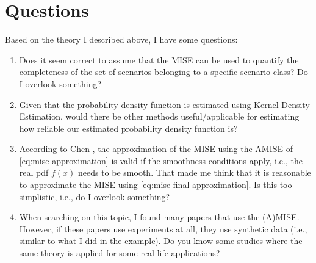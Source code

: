 \documentclass[10pt,final,a4paper,oneside,onecolumn]{article}
\theoremstyle{plain}\newtheorem{definition}{Definition}[section]    %
\theoremstyle{definition}\newtheorem{example}{Example}[section]     %
\theoremstyle{remark}\newtheorem{remarkenv}{Remark}[section]        %
\begin{document}
\section{Questions}
\label{sec:questions}

Based on the theory I described above, I have some questions:

\begin{enumerate}
	\item \label{question:mise} Does it seem correct to assume that the MISE can be used to quantify the completeness of the set of scenarios belonging to a specific scenario class? Do I overlook something?
	\item Given that the probability density function is estimated using Kernel Density Estimation, would there be other methods useful/applicable for estimating how reliable our estimated probability density function is?
	\item According to Chen \cite{chen2017tutorial}, the approximation of the MISE using the AMISE of \cref{eq:mise approximation} is valid if the smoothness conditions apply, i.e., the real pdf $f(x)$ needs to be smooth. That made me think that it is reasonable to approximate the MISE using \cref{eq:mise final approximation}. Is this too simplistic, i.e., do I overlook something?
	\item When searching on this topic, I found many papers that use the (A)MISE. However, if these papers use experiments at all, they use synthetic data (i.e., similar to what I did in the example). Do you know some studies where the same theory is applied for some real-life applications?
\end{enumerate}

\printbibliography
\end{document}
